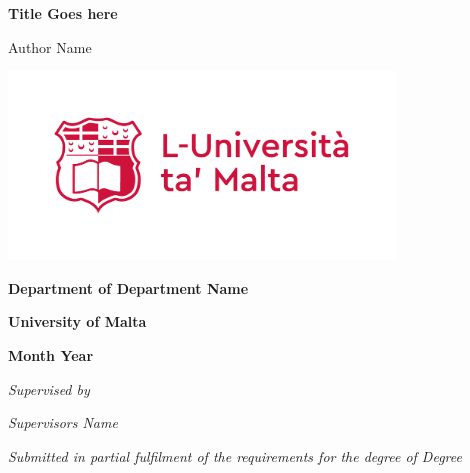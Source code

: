 \begin{titlepage}
    \begin{center}
        \LARGE
        \textbf{Title Goes here}

        Author Name

        \includegraphics[height=5cm,keepaspectratio]{Figures/umLogo}

        \large
        \textbf{Department of Department Name}

        \textbf{University of Malta}

        \textbf{Month Year}

        \vfill

        \textit{Supervised by}

        \textit{Supervisors Name}

        \vfill

        \textit{Submitted in partial fulfilment of the requirements for the degree of Degree}
    \end{center}
\end{titlepage}
\hypersetup{pageanchor=true}
